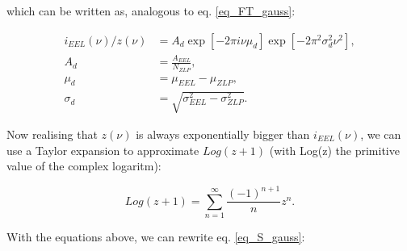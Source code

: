which can be written as, analogous to eq. \eqref{eq_FT_gauss}:



\begin{equation}\label{eq_gauss_conv2}
\begin{aligned}
i_{EEL}(\nu)/z(\nu) &= A_d \exp{[-2\pi i \nu \mu_d]} \exp{\left[ -2\pi^2 \sigma_d^2 \nu^2 \right]},\\
A_d &= \frac{A_{EEL}}{N_{ZLP}},\\
\mu_d &= \mu_{EEL} - \mu_{ZLP},\\
\sigma_d &= \sqrt{\sigma_{EEL}^2 - \sigma_{ZLP}^2}.
\end{aligned}
\end{equation}






Now realising that $z(\nu)$ is always exponentially bigger than $i_{EEL}(\nu)$, we can use a Taylor expansion to approximate $Log(z+1)$ (with Log(z) the primitive value of the complex logaritm):

\begin{equation}
Log(z+1) = \sum_{n=1}^\infty \frac{(-1)^{n+1}}{n} z^n.
\end{equation}


With the equations above, we can rewrite eq. \eqref{eq_S_gauss}:

